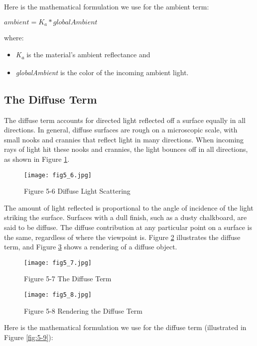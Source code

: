 \documentclass[../main.tex]{subfiles}
\begin{document}
Here is the mathematical formulation we use for the ambient term:

$ambient = K_a * globalAmbient$

where:

\begin{itemize}
\item \textit{K\textsubscript{a}} is the material's ambient reflectance and
\item \textit{globalAmbient} is the color of the incoming ambient light.
\end{itemize}

\subsection*{The Diffuse Term}

The diffuse term accounts for directed light reflected off a surface equally in all directions. In general, diffuse surfaces are rough on a microscopic scale, with small nooks and crannies that reflect light in many directions. When incoming rays of light hit these nooks and crannies, the light bounces off in all directions, as shown in Figure \ref{fig:5-6}.

\begin{figure}
    \centering
    \texttt{[image: fig5\_6.jpg]}
    \caption{Figure 5-6 Diffuse Light Scattering}
    \label{fig:5-6}
\end{figure}

The amount of light reflected is proportional to the angle of incidence of the light striking the surface. Surfaces with a dull finish, such as a dusty chalkboard, are said to be diffuse. The diffuse contribution at any particular point on a surface is the same, regardless of where the viewpoint is. Figure \ref{fig:5-7} illustrates the diffuse term, and Figure \ref{fig:5-8} shows a rendering of a diffuse object.

\begin{figure}
    \centering
    \texttt{[image: fig5\_7.jpg]}
    \caption{Figure 5-7 The Diffuse Term}
    \label{fig:5-7}
\end{figure}

\begin{figure}
    \centering
    \texttt{[image: fig5\_8.jpg]}
    \caption{Figure 5-8 Rendering the Diffuse Term}
    \label{fig:5-8}
\end{figure}

Here is the mathematical formulation we use for the diffuse term (illustrated in Figure \ref{fig:5-9}):
\end{document}
